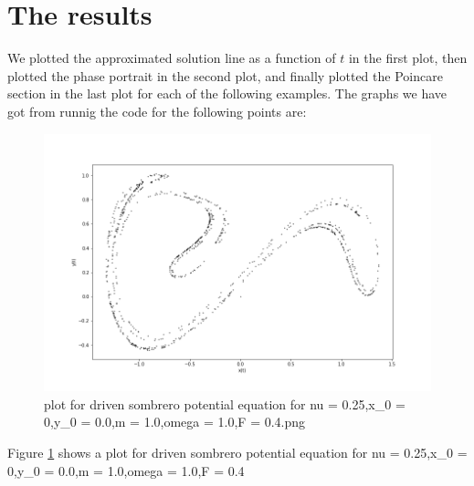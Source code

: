\documentclass[aps,pra,notitlepage,amsmath,amssymb,letterpaper,12pt]{revtex4-1}
\theoremstyle{definition}
\begin{document}
\section{The results}
We plotted the approximated solution line as a function of $t$ in the first plot, then plotted the phase portrait in the second plot, and finally plotted the Poincare section in the last plot for each of the following examples.
The graphs we have got from runnig the code for the following points are:
\begin{figure}
  \includegraphics[width=\linewidth]{plot for driven sombrero potential equation for nu = 0.25,x_0 = 0,y_0 = 0.0,m = 1.0,omega = 1.0,F = 0.4.png}
  \caption{plot for driven sombrero potential equation for nu = 0.25,x_0 = 0,y_0 = 0.0,m = 1.0,omega = 1.0,F = 0.4.png}
  \label{fig:1}
\end{figure}



Figure \ref{fig:1} shows  a plot for driven sombrero potential equation for nu = 0.25,x_0 = 0,y_0 = 0.0,m = 1.0,omega = 1.0,F = 0.4 
\end{document}
